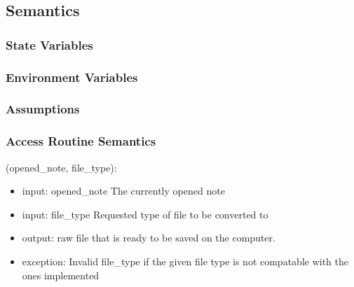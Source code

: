 \documentclass[12pt, titlepage]{article}
\begin{document}
\subsection{Semantics}

\subsubsection{State Variables}


\subsubsection{Environment Variables}


\subsubsection{Assumptions}


\subsubsection{Access Routine Semantics}

(opened\_note, file\_type):
\begin{itemize}
\item input: opened\_note The currently opened note
\item input: file\_type Requested type of file to be converted to 
\item output: raw file that is ready to be saved on the computer.
\item exception: Invalid file\_type if the given file type is not compatable with the ones implemented
\end{itemize}

%
\end{document}

